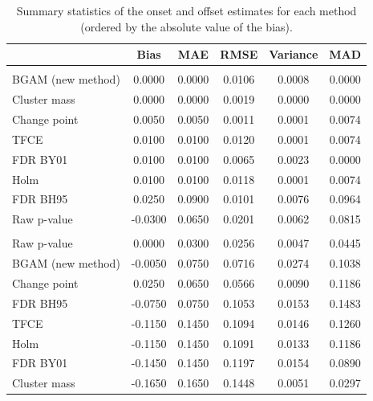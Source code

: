 \documentclass[
  doc,
  floatsintext,
  longtable,
  a4paper,
  nolmodern,
  notxfonts,
  notimes,
  donotrepeattitle,
  colorlinks=true,linkcolor=blue,citecolor=blue,urlcolor=blue]{apa7}
\begin{document}
\begin{table}

{\caption{{Summary statistics of the onset and offset estimates for each
method (ordered by the absolute value of the
bias).}{\label{tbl-reliability-results}}}}

\fontsize{9.0pt}{10.8pt}\selectfont
\begin{tabular*}{\linewidth}{@{\extracolsep{\fill}}lccccc}
\toprule
 & Bias & MAE & RMSE & Variance & MAD \\ 
\midrule\addlinespace[2.5pt]
\multicolumn{6}{l}{onset} \\[2.5pt] 
\midrule\addlinespace[2.5pt]
BGAM (new method) & 0.0000 & 0.0000 & 0.0106 & 0.0008 & 0.0000 \\ 
Cluster mass & 0.0000 & 0.0000 & 0.0019 & 0.0000 & 0.0000 \\ 
Change point & 0.0050 & 0.0050 & 0.0011 & 0.0001 & 0.0074 \\ 
TFCE & 0.0100 & 0.0100 & 0.0120 & 0.0001 & 0.0074 \\ 
FDR BY01 & 0.0100 & 0.0100 & 0.0065 & 0.0023 & 0.0000 \\ 
Holm & 0.0100 & 0.0100 & 0.0118 & 0.0001 & 0.0074 \\ 
FDR BH95 & 0.0250 & 0.0900 & 0.0101 & 0.0076 & 0.0964 \\ 
Raw p-value & -0.0300 & 0.0650 & 0.0201 & 0.0062 & 0.0815 \\ 
\midrule\addlinespace[2.5pt]
\multicolumn{6}{l}{offset} \\[2.5pt] 
\midrule\addlinespace[2.5pt]
Raw p-value & 0.0000 & 0.0300 & 0.0256 & 0.0047 & 0.0445 \\ 
BGAM (new method) & -0.0050 & 0.0750 & 0.0716 & 0.0274 & 0.1038 \\ 
Change point & 0.0250 & 0.0650 & 0.0566 & 0.0090 & 0.1186 \\ 
FDR BH95 & -0.0750 & 0.0750 & 0.1053 & 0.0153 & 0.1483 \\ 
TFCE & -0.1150 & 0.1450 & 0.1094 & 0.0146 & 0.1260 \\ 
Holm & -0.1150 & 0.1450 & 0.1091 & 0.0133 & 0.1186 \\ 
FDR BY01 & -0.1450 & 0.1450 & 0.1197 & 0.0154 & 0.0890 \\ 
Cluster mass & -0.1650 & 0.1650 & 0.1448 & 0.0051 & 0.0297 \\ 
\bottomrule
\end{tabular*}

\end{table}

\newpage
\end{document}
